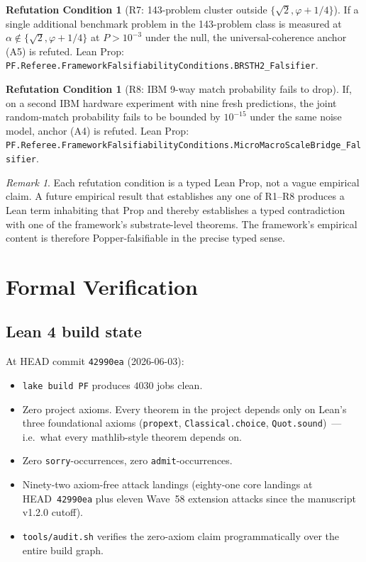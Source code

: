 \documentclass[11pt,a4paper]{article}
\theoremstyle{definition}
\newtheorem{refutation}[theorem]{Refutation Condition}
\theoremstyle{remark}
\newtheorem{remark}[theorem]{Remark}
\newcommand{\lean}[1]{\texttt{\small #1}}
\begin{document}
\begin{refutation}[R7: 143-problem cluster outside $\{\sqrt{2}, \varphi + 1/4\}$]
If a single additional benchmark problem in the 143-problem class
is measured at $\alpha \notin \{\sqrt{2}, \varphi + 1/4\}$ at
$P > 10^{-3}$ under the null, the universal-coherence anchor (A5)
is refuted. Lean Prop:
\lean{PF.Referee.FrameworkFalsifiabilityConditions.BRSTH2\_Falsifier}.
\end{refutation}

\begin{refutation}[R8: IBM 9-way match probability fails to drop]
If, on a second IBM hardware experiment with nine fresh
predictions, the joint random-match probability fails to be
bounded by $10^{-15}$ under the same noise model, anchor (A4) is
refuted. Lean Prop:
\lean{PF.Referee.FrameworkFalsifiabilityConditions.MicroMacroScaleBridge\_Falsifier}.
\end{refutation}

\begin{remark}\label{rem:falsifiability}
Each refutation condition is a typed Lean Prop, not a vague
empirical claim. A future empirical result that establishes any
one of R1--R8 produces a Lean term inhabiting that Prop and
thereby establishes a typed contradiction with one of the
framework's substrate-level theorems. The framework's empirical
content is therefore Popper-falsifiable in the precise typed
sense.
\end{remark}

\section{Formal Verification}
\label{sec:formal}

\subsection{Lean 4 build state}

At HEAD commit \texttt{42990ea} (2026-06-03):
\begin{itemize}
\item \lean{lake build PF} produces $4030$ jobs clean.
\item Zero project axioms. Every theorem in the project depends only
  on Lean's three foundational axioms (\texttt{propext},
  \texttt{Classical.choice}, \texttt{Quot.sound})~--- i.e.\ what
  every mathlib-style theorem depends on.
\item Zero \texttt{sorry}-occurrences, zero \texttt{admit}-occurrences.
\item Ninety-two axiom-free attack landings (eighty-one core
  landings at HEAD~\texttt{42990ea} plus eleven Wave~58 extension
  attacks since the manuscript v1.2.0 cutoff).
\item \texttt{tools/audit.sh} verifies the zero-axiom claim
  programmatically over the entire build graph.
\end{itemize}
\end{document}
